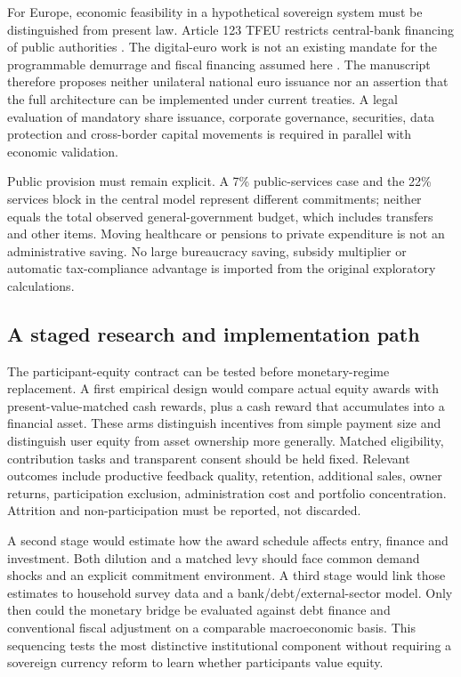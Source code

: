 For Europe, economic feasibility in a hypothetical sovereign system must be distinguished from present law. Article 123 TFEU restricts central-bank financing of public authorities \citep{tfeu123}. The digital-euro work is not an existing mandate for the programmable demurrage and fiscal financing assumed here \citep{ecbpilot2026,bundesbank2026}. The manuscript therefore proposes neither unilateral national euro issuance nor an assertion that the full architecture can be implemented under current treaties. A legal evaluation of mandatory share issuance, corporate governance, securities, data protection and cross-border capital movements is required in parallel with economic validation.

Public provision must remain explicit. A 7\% public-services case and the 22\% services block in the central model represent different commitments; neither equals the total observed general-government budget, which includes transfers and other items. Moving healthcare or pensions to private expenditure is not an administrative saving. No large bureaucracy saving, subsidy multiplier or automatic tax-compliance advantage is imported from the original exploratory calculations.

\subsection{A staged research and implementation path}
The participant-equity contract can be tested before monetary-regime replacement. A first empirical design would compare actual equity awards with present-value-matched cash rewards, plus a cash reward that accumulates into a financial asset. These arms distinguish incentives from simple payment size and distinguish user equity from asset ownership more generally. Matched eligibility, contribution tasks and transparent consent should be held fixed. Relevant outcomes include productive feedback quality, retention, additional sales, owner returns, participation exclusion, administration cost and portfolio concentration. Attrition and non-participation must be reported, not discarded.

A second stage would estimate how the award schedule affects entry, finance and investment. Both dilution and a matched levy should face common demand shocks and an explicit commitment environment. A third stage would link those estimates to household survey data and a bank/debt/external-sector model. Only then could the monetary bridge be evaluated against debt finance and conventional fiscal adjustment on a comparable macroeconomic basis. This sequencing tests the most distinctive institutional component without requiring a sovereign currency reform to learn whether participants value equity.

